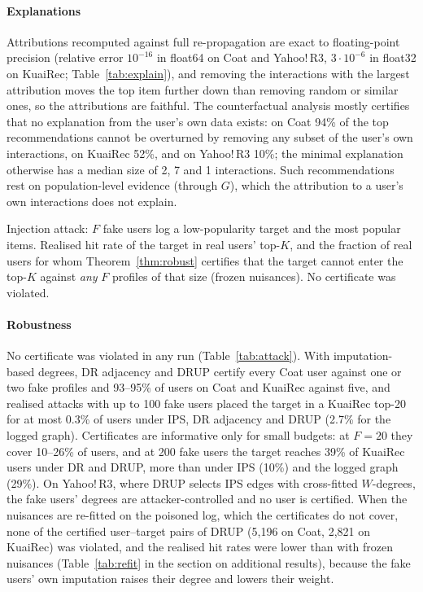\documentclass[preprint,review,12pt,authoryear]{elsarticle}
\theoremstyle{definition}
\begin{document}
\paragraph{Explanations} Attributions recomputed against full re-propagation
are exact to floating-point precision (relative error $10^{-16}$ in float64 on
Coat and Yahoo!\,R3, $3\cdot10^{-6}$ in float32 on KuaiRec; Table~\ref{tab:explain}), and removing the
interactions with the largest attribution moves the top item further down than
removing random or similar ones, so the attributions are faithful. The
counterfactual analysis mostly certifies that no explanation from the user's
own data exists: on Coat 94\% of the top recommendations cannot be overturned by removing any subset of the user's own interactions, on KuaiRec 52\%, and on Yahoo!\,R3 10\%; the minimal explanation otherwise has a median size of 2, 7 and 1 interactions. Such recommendations rest on population-level
evidence (through $G$), which the attribution to a user's own interactions does
not explain.

\begin{table}[t]\centering\small
\caption{Injection attack: $F$ fake users log a low-popularity target and the most
popular items. Realised hit rate of the target in real users' top-$K$, and the
fraction of real users for whom Theorem~\ref{thm:robust} certifies that the target
cannot enter the top-$K$ against \emph{any} $F$ profiles of that size (frozen
nuisances). No certificate was violated.}\label{tab:attack}
\begin{adjustbox}{max width=\textwidth}

\end{adjustbox}
\end{table}

\paragraph{Robustness} No certificate was violated in any run
(Table~\ref{tab:attack}). With imputation-based degrees, DR adjacency and DRUP
certify every Coat user against one or two fake profiles and 93--95\% of users on
Coat and KuaiRec against five, and realised attacks with up to 100 fake users
placed the target in a KuaiRec top-20 for at most 0.3\% of users under IPS, DR adjacency and
DRUP (2.7\% for the logged graph). Certificates are informative only
for small budgets: at $F=20$ they cover 10--26\% of users, and at 200 fake users
the target reaches 39\% of KuaiRec users under DR and DRUP, more than under IPS
(10\%) and the logged graph (29\%). On Yahoo!\,R3, where DRUP selects IPS edges with
cross-fitted $W$-degrees, the fake users' degrees are attacker-controlled and no
user is certified. When the nuisances are re-fitted on the poisoned log, which
the certificates do not cover, none of the certified user--target pairs of DRUP (5{,}196 on Coat, 2{,}821 on KuaiRec)
was violated, and the realised hit rates were lower than with frozen nuisances
(Table~\ref{tab:refit} in the section on additional results), because the fake users' own
imputation raises their degree and lowers their weight.
\end{document}
